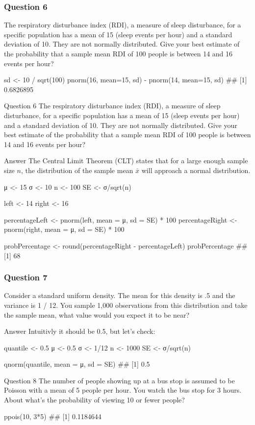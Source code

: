 \begin{frame}[fragile]
\frametitle{Question 6}
The respiratory disturbance index (RDI), a measure of sleep disturbance, for a specific population has a mean of 15 (sleep events per hour) and a standard deviation of 10. They are not normally distributed. Give your best estimate of the probability that a sample mean RDI of 100 people is between 14 and 16 events per hour?

sd <- 10 / sqrt(100)
pnorm(16, mean=15, sd) - pnorm(14, mean=15, sd)
## [1] 0.6826895


Question 6
The respiratory disturbance index (RDI), a measure of sleep disturbance, for a specific population has a mean of 15 (sleep events per hour) and a standard deviation of 10. They are not normally distributed. Give your best estimate of the probability that a sample mean RDI of 100 people is between 14 and 16 events per hour?

Answer
The Central Limit Theorem (CLT) states that for a large enough sample size \(n\), the distribution of the sample mean \(\bar x\) will approach a normal distribution.

μ <- 15
σ <- 10
n <- 100
SE <- σ/sqrt(n)

left <- 14
right <- 16

percentageLeft <- pnorm(left, mean = μ, sd = SE) * 100
percentageRight <- pnorm(right, mean = μ, sd = SE) * 100

probPercentage <- round(percentageRight - percentageLeft)
probPercentage
## [1] 68

\end{frame}
\begin{frame}[fragile]
\frametitle{Question 7}
Consider a standard uniform density. The mean for this density is .5 and the variance is 1 / 12. You sample 1,000 observations from this distribution and take the sample mean, what value would you expect it to be near?

Answer
Intuitivly it should be 0.5, but let’s check:

quantile <- 0.5
μ <- 0.5
σ <- 1/12
n <- 1000
SE <- σ/sqrt(n)

qnorm(quantile, mean = μ, sd = SE)
## [1] 0.5

\end{frame}
\begin{frame}
Question 8
The number of people showing up at a bus stop is assumed to be Poisson with a mean of 5 people per hour. You watch the bus stop for 3 hours. About what’s the probability of viewing 10 or fewer people?

ppois(10, 3*5)
## [1] 0.1184644

\end{frame}
